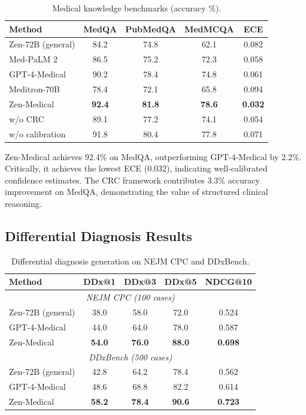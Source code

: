 \documentclass[11pt,a4paper]{article}
\begin{document}
\begin{table}[t]
\centering
\caption{Medical knowledge benchmarks (accuracy \%).}
\label{tab:medqa}
\begin{tabular}{lcccc}
\toprule
\textbf{Method} & \textbf{MedQA} & \textbf{PubMedQA} & \textbf{MedMCQA} & \textbf{ECE} \\
\midrule
Zen-72B (general) & 84.2 & 74.8 & 62.1 & 0.082 \\
Med-PaLM 2 & 86.5 & 75.2 & 72.3 & 0.058 \\
GPT-4-Medical & 90.2 & 78.4 & 74.8 & 0.061 \\
Meditron-70B & 78.4 & 72.1 & 65.8 & 0.094 \\
\midrule
Zen-Medical & \textbf{92.4} & \textbf{81.8} & \textbf{78.6} & \textbf{0.032} \\
\quad w/o CRC & 89.1 & 77.2 & 74.1 & 0.054 \\
\quad w/o calibration & 91.8 & 80.4 & 77.8 & 0.071 \\
\bottomrule
\end{tabular}
\end{table}

Zen-Medical achieves 92.4\% on MedQA, outperforming GPT-4-Medical by 2.2\%. Critically, it achieves the lowest ECE (0.032), indicating well-calibrated confidence estimates. The CRC framework contributes 3.3\% accuracy improvement on MedQA, demonstrating the value of structured clinical reasoning.

\subsection{Differential Diagnosis Results}

\begin{table}[t]
\centering
\caption{Differential diagnosis generation on NEJM CPC and DDxBench.}
\label{tab:ddx}
\begin{tabular}{lcccc}
\toprule
\textbf{Method} & \textbf{DDx@1} & \textbf{DDx@3} & \textbf{DDx@5} & \textbf{NDCG@10} \\
\midrule
\multicolumn{5}{c}{\textit{NEJM CPC (100 cases)}} \\
\midrule
Zen-72B (general) & 38.0 & 58.0 & 72.0 & 0.524 \\
GPT-4-Medical & 44.0 & 64.0 & 78.0 & 0.587 \\
Zen-Medical & \textbf{54.0} & \textbf{76.0} & \textbf{88.0} & \textbf{0.698} \\
\midrule
\multicolumn{5}{c}{\textit{DDxBench (500 cases)}} \\
\midrule
Zen-72B (general) & 42.8 & 64.2 & 78.4 & 0.562 \\
GPT-4-Medical & 48.6 & 68.8 & 82.2 & 0.614 \\
Zen-Medical & \textbf{58.2} & \textbf{78.4} & \textbf{90.6} & \textbf{0.723} \\
\bottomrule
\end{tabular}
\end{table}
\end{document}
